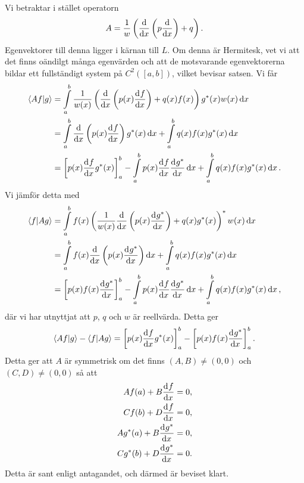 \proof
Vi betraktar i stället operatorn
\begin{align*}
	A = \frac{1}{w}\left(\dv{x}\left(p\dv{x}\right) + q\right).
\end{align*}
Egenvektorer till denna ligger i kärnan till $L$. Om denna är Hermitesk, vet vi att det finns oändilgt många egenvärden och att de motsvarande egenvektorerna bildar ett fullständigt system på $C^{2}([a, b])$, vilket bevisar satsen. Vi får
\begin{align*}
	\bra{Af}\ket{g} &= \int\limits_{a}^{b}\frac{1}{w(x)}\left(\dv{x}\left(p(x)\dv[]{f}{x} (x)\right) + q(x)f(x)\right)g^{*}(x)w(x)\dd{x} \\
	               &= \int\limits_{a}^{b}\dv{x}\left(p(x)\dv[]{f}{x} (x)\right)g^{*}(x)\dd{x} + \int\limits_{a}^{b}q(x)f(x)g^{*}(x)\dd{x} \\
	               &= \left[p(x)\dv[]{f}{x} (x)g^{*}(x)\right]_{a}^{b} - \int\limits_{a}^{b}p(x)\dv[]{f}{x} (x)\dv[]{g^{*}}{x} (x)\dd{x} + \int\limits_{a}^{b}q(x)f(x)g^{*}(x)\dd{x}.
\end{align*}
Vi jämför detta med
\begin{align*}
	\bra{f}\ket{Ag}&= \int\limits_{a}^{b}f(x)\left(\frac{1}{w(x)}\dv{x}\left(p(x)\dv[]{g^{*}}{x} (x)\right) + q(x)g^{*}(x)\right)^{*}w(x)\dd{x} \\
	               &= \int\limits_{a}^{b}f(x)\dv{x}\left(p(x)\dv[]{g^{*}}{x} (x)\right)\dd{x} + \int\limits_{a}^{b}q(x)f(x)g^{*}(x)\dd{x} \\
	               &= \left[p(x)f(x)\dv[]{g^{*}}{x} (x)\right]_{a}^{b} - \int\limits_{a}^{b}p(x)\dv[]{f}{x} (x)\dv[]{g^{*}}{x} (x)\dd{x} + \int\limits_{a}^{b}q(x)f(x)g^{*}(x)\dd{x},
\end{align*}
där vi har utnyttjat att $p$, $q$ och $w$ är reellvärda. Detta ger
\begin{align*}
	\bra{Af}\ket{g} - \bra{f}\ket{Ag} = \left[p(x)\dv[]{f}{x} (x)g^{*}(x)\right]_{a}^{b} - \left[p(x)f(x)\dv[]{g^{*}}{x} (x)\right]_{a}^{b}.
\end{align*}
Detta ger att $A$ är symmetrisk om det finns $(A, B) \neq (0, 0)$ och $(C, D) \neq (0, 0)$ så att
\begin{align*}
	Af(a) + B\dv[]{f}{x} (a) = 0, \\
	Cf(b) + D\dv[]{f}{x} (b) = 0, \\
	Ag^{*}(a) + B\dv[]{g^{*}}{x} (a) = 0, \\
	Cg^{*}(b) + D\dv[]{g^{*}}{x} (b) = 0.
\end{align*}
Detta är sant enligt antagandet, och därmed är beviset klart.

